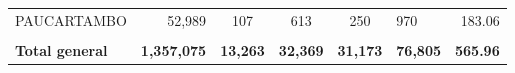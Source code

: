 \begin{tabular}{lrccclr}
	\cellcolor[HTML]{C6E0B4}PAUCARTAMBO                            & 52,989                                                         & 107                                                         & 613                  & 250                      & 970                                                                 & 183.06                                                                       \\
	& \multicolumn{1}{l}{}                                           & \multicolumn{1}{l}{}                                        & \multicolumn{1}{l}{} & \multicolumn{1}{l}{}     &                                                                     & \multicolumn{1}{l}{}                                                         \\
	\rowcolor[HTML]{DDEBF7} 
	\textbf{Total   general}                                       & \textbf{1,357,075}                                             & \multicolumn{1}{r}{\cellcolor[HTML]{DDEBF7}\textbf{13,263}} & \textbf{32,369}      & \textbf{31,173}          & \textbf{76,805}                                                     & \textbf{565.96}                                                             
\end{tabular}